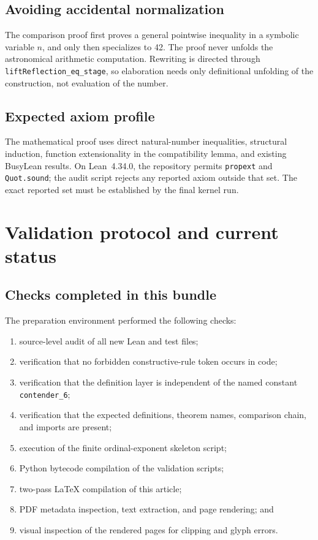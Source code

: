 \documentclass[11pt]{article}
\theoremstyle{definition}
\theoremstyle{remark}
\newcommand{\lean}[1]{\texttt{#1}}
\begin{document}
\subsection{Avoiding accidental normalization}

The comparison proof first proves a general pointwise inequality in a symbolic
variable \(n\), and only then specializes to 42.  The proof never unfolds the
astronomical arithmetic computation.  Rewriting is directed through
\lean{liftReflection\_eq\_stage}, so elaboration needs only definitional
unfolding of the construction, not evaluation of the number.

\subsection{Expected axiom profile}

The mathematical proof uses direct natural-number inequalities, structural
induction, function extensionality in the compatibility lemma, and existing
BusyLean results.  On Lean~4.34.0, the repository permits \lean{propext} and
\lean{Quot.sound}; the audit script rejects any reported axiom outside that
set.  The exact reported set must be established by the final kernel run.

\section{Validation protocol and current status}
\label{sec:validation}

\subsection{Checks completed in this bundle}

The preparation environment performed the following checks:
\begin{enumerate}[leftmargin=*]
  \item source-level audit of all new Lean and test files;
  \item verification that no forbidden constructive-rule token occurs in code;
  \item verification that the definition layer is independent of the named
        constant \lean{contender\_6};
  \item verification that the expected definitions, theorem names, comparison
        chain, and imports are present;
  \item execution of the finite ordinal-exponent skeleton script;
  \item Python bytecode compilation of the validation scripts;
  \item two-pass \LaTeX{} compilation of this article;
  \item PDF metadata inspection, text extraction, and page rendering; and
  \item visual inspection of the rendered pages for clipping and glyph errors.
\end{enumerate}
\end{document}
